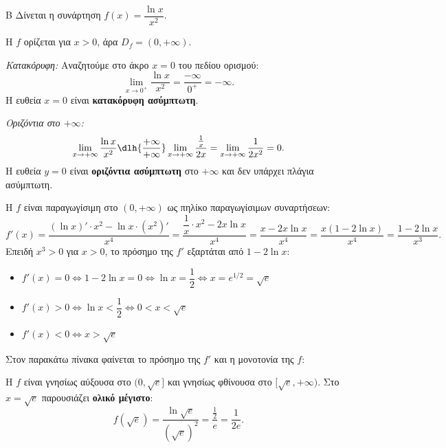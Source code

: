 \begin{thema}{Β}
Δίνεται η συνάρτηση $f(x) = \dfrac{\ln x}{x^2}$.

\begin{erwthma}

\item Η $f$ ορίζεται για $x>0$, άρα $D_f=(0,+\infty)$.

\textit{Κατακόρυφη:} Αναζητούμε στο άκρο $x=0$ του πεδίου ορισμού:
\[
\lim_{x\to0^+}\frac{\ln x}{x^2}=\frac{-\infty}{0^+}=-\infty.
\]
Η ευθεία $x=0$ είναι \textbf{κατακόρυφη ασύμπτωτη}.

\textit{Οριζόντια στο $+\infty$:}
\[
\lim_{x\to+\infty}\frac{\ln x}{x^2}\dlh{\frac{+\infty}{+\infty}}\lim_{x\to+\infty}\frac{\frac{1}{x}}{2x}=\lim_{x\to+\infty}\frac{1}{2x^2}=0.
\]
Η ευθεία $y=0$ είναι \textbf{οριζόντια ασύμπτωτη} στο $+\infty$ και δεν υπάρχει πλάγια ασύμπτωτη.

\item Η $f$ είναι παραγωγίσιμη στο $(0,+\infty)$ ως πηλίκο παραγωγίσιμων συναρτήσεων:
\[
f'(x)=\frac{(\ln x)'\cdot x^2-\ln x\cdot(x^2)'}{x^4}=\frac{\dfrac{1}{x}\cdot x^2-2x\ln x}{x^4}=\frac{x-2x\ln x}{x^4}=\frac{x(1-2\ln x)}{x^4}=\frac{1-2\ln x}{x^3}.
\]
Επειδή $x^3>0$ για $x>0$, το πρόσημο της $f'$ εξαρτάται από $1-2\ln x$:
\begin{itemize}
    \item $f'(x)=0 \Leftrightarrow 1-2\ln x=0 \Leftrightarrow \ln x=\dfrac{1}{2} \Leftrightarrow x=e^{1/2}=\sqrt{e}$
    \item $f'(x)>0 \Leftrightarrow \ln x<\dfrac{1}{2} \Leftrightarrow 0<x<\sqrt{e}$
    \item $f'(x)<0 \Leftrightarrow x>\sqrt{e}$
\end{itemize}
Στον παρακάτω πίνακα φαίνεται το πρόσημο της $f'$ και η μονοτονία της $f$:
\begin{center}
\end{center}
Η $f$ είναι γνησίως αύξουσα στο $(0,\sqrt{e}]$ και γνησίως φθίνουσα στο $[\sqrt{e},+\infty)$.
Στο $x=\sqrt{e}$ παρουσιάζει \textbf{ολικό μέγιστο}:
\[
f(\sqrt{e})=\frac{\ln\sqrt{e}}{(\sqrt{e})^2}=\frac{\frac{1}{2}}{e}=\frac{1}{2e}.
\]


\end{erwthma}
\end{thema}
